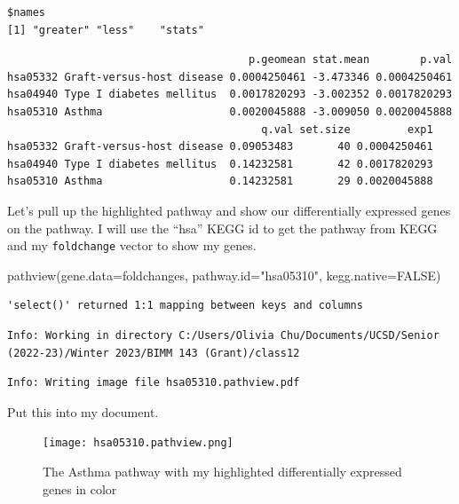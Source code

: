 \documentclass[
  letterpaper,
  DIV=11,
  numbers=noendperiod]{scrartcl}
\newenvironment{Shaded}{\begin{snugshade}}{\end{snugshade}}
\newcommand{\AttributeTok}[1]{\textcolor[rgb]{0.40,0.45,0.13}{#1}}
\newcommand{\CommentTok}[1]{\textcolor[rgb]{0.37,0.37,0.37}{#1}}
\newcommand{\ConstantTok}[1]{\textcolor[rgb]{0.56,0.35,0.01}{#1}}
\newcommand{\DecValTok}[1]{\textcolor[rgb]{0.68,0.00,0.00}{#1}}
\newcommand{\FunctionTok}[1]{\textcolor[rgb]{0.28,0.35,0.67}{#1}}
\newcommand{\NormalTok}[1]{\textcolor[rgb]{0.00,0.23,0.31}{#1}}
\newcommand{\SpecialCharTok}[1]{\textcolor[rgb]{0.37,0.37,0.37}{#1}}
\newcommand{\StringTok}[1]{\textcolor[rgb]{0.13,0.47,0.30}{#1}}
\begin{document}
\begin{verbatim}
$names
[1] "greater" "less"    "stats"  
\end{verbatim}

\begin{Shaded}
\end{Shaded}

\begin{verbatim}
                                      p.geomean stat.mean        p.val
hsa05332 Graft-versus-host disease 0.0004250461 -3.473346 0.0004250461
hsa04940 Type I diabetes mellitus  0.0017820293 -3.002352 0.0017820293
hsa05310 Asthma                    0.0020045888 -3.009050 0.0020045888
                                        q.val set.size         exp1
hsa05332 Graft-versus-host disease 0.09053483       40 0.0004250461
hsa04940 Type I diabetes mellitus  0.14232581       42 0.0017820293
hsa05310 Asthma                    0.14232581       29 0.0020045888
\end{verbatim}

Let's pull up the highlighted pathway and show our differentially
expressed genes on the pathway. I will use the ``hsa'' KEGG id to get
the pathway from KEGG and my \texttt{foldchange} vector to show my
genes.

\begin{Shaded}
\begin{Highlighting}[]
\FunctionTok{pathview}\NormalTok{(}\AttributeTok{gene.data=}\NormalTok{foldchanges, }\AttributeTok{pathway.id=}\StringTok{"hsa05310"}\NormalTok{, }\AttributeTok{kegg.native=}\ConstantTok{FALSE}\NormalTok{)}
\end{Highlighting}
\end{Shaded}

\begin{verbatim}
'select()' returned 1:1 mapping between keys and columns
\end{verbatim}

\begin{verbatim}
Info: Working in directory C:/Users/Olivia Chu/Documents/UCSD/Senior (2022-23)/Winter 2023/BIMM 143 (Grant)/class12
\end{verbatim}

\begin{verbatim}
Info: Writing image file hsa05310.pathview.pdf
\end{verbatim}

Put this into my document.

\begin{figure}

{\centering \texttt{[image: hsa05310.pathview.png]}

}

\caption{The Asthma pathway with my highlighted differentially expressed
genes in color}

\end{figure}
\end{document}
